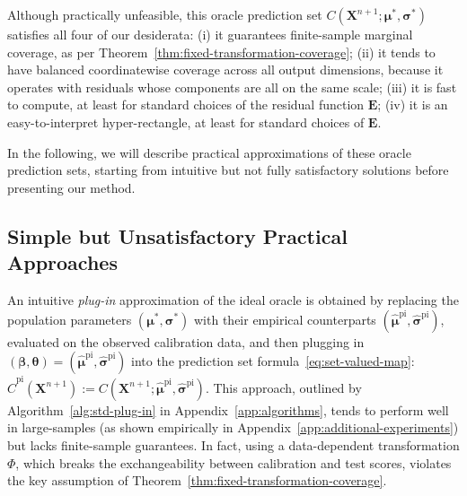 Although practically unfeasible, this oracle prediction set $C(\mathbf{X}^{n+1}; \boldsymbol\mu^*, \boldsymbol\sigma^*)$ satisfies all four of our desiderata: (i) it guarantees finite-sample marginal coverage, as per Theorem~\ref{thm:fixed-transformation-coverage}; (ii) it tends to have balanced coordinatewise coverage across all output dimensions, because it operates with residuals whose components are all on the same scale; (iii) it is fast to compute, at least for standard choices of the residual function $\mathbf E$; (iv) it is an easy-to-interpret hyper-rectangle, at least for standard choices of $\mathbf E$.

In the following, we will describe practical approximations of these oracle prediction sets, starting from intuitive but not fully satisfactory solutions before presenting our method.


\subsection{Simple but Unsatisfactory Practical Approaches} \label{sec:data-splitting}

An intuitive {\em plug-in} approximation of the ideal oracle is obtained by replacing the population parameters $(\boldsymbol{\mu}^*,\boldsymbol{\sigma}^*)$ with their empirical counterparts $(\boldsymbol{\hat{\mu}}^{\mathrm{pi}},\boldsymbol{\hat{\sigma}}^{\mathrm{pi}})$, evaluated on the observed calibration data, and then plugging in $(\boldsymbol{\beta},\boldsymbol{\theta})=(\hat{\boldsymbol\mu}^{\mathrm{pi}}, \hat{\boldsymbol\sigma}^{\mathrm{pi}})$ into the prediction set formula~\eqref{eq:set-valued-map}: $\hat{C}^{\mathrm{pi}}(\mathbf{X}^{n+1}):= C(\mathbf{X}^{n+1};\hat{\boldsymbol\mu}^{\mathrm{pi}}, \hat{\boldsymbol\sigma}^{\mathrm{pi}})$. This approach, outlined by Algorithm~\ref{alg:std-plug-in} in Appendix~\ref{app:algorithms}, tends to perform well in large-samples (as shown empirically in Appendix~\ref{app:additional-experiments}) but lacks finite-sample guarantees.
In fact, using a data-dependent transformation $\Phi$, which breaks the exchangeability between calibration and test scores, violates the key assumption of Theorem~\ref{thm:fixed-transformation-coverage}.

